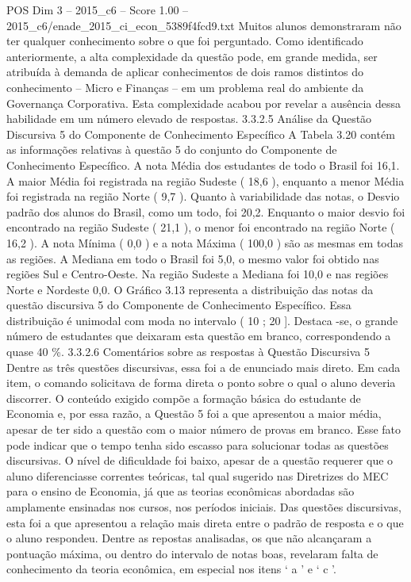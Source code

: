 \begin{textsample}{POS Dim 3 – 2015\_c6 – Score 1.00 – 2015\_c6/enade\_2015\_ci\_econ\_5389f4fcd9.txt}
Muitos alunos demonstraram não ter qualquer conhecimento sobre o que foi perguntado.
Como identificado anteriormente, a alta complexidade da questão pode, em grande medida, ser atribuída à demanda de aplicar conhecimentos de dois ramos distintos do conhecimento – Micro e Finanças – em um problema real do ambiente da Governança Corporativa.
Esta complexidade acabou por revelar a ausência dessa habilidade em um número elevado de respostas. 3.3.2.5 Análise da Questão Discursiva 5 do Componente de Conhecimento Específico A Tabela 3.20 contém as informações relativas à questão 5 do conjunto do Componente de Conhecimento Específico.
A nota Média dos estudantes de todo o Brasil foi 16,1.
A maior Média foi registrada na região Sudeste ( 18,6 ), enquanto a menor Média foi registrada na região Norte ( 9,7 ).
Quanto à variabilidade das notas, o Desvio padrão dos alunos do Brasil, como um todo, foi 20,2.
Enquanto o maior desvio foi encontrado na região Sudeste ( 21,1 ), o menor foi encontrado na região Norte ( 16,2 ).
A nota Mínima ( 0,0 ) e a nota Máxima ( 100,0 ) são as mesmas em todas as regiões.
A Mediana em todo o Brasil foi 5,0, o mesmo valor foi obtido nas regiões Sul e Centro-Oeste.
Na região Sudeste a Mediana foi 10,0 e nas regiões Norte e Nordeste 0,0.
O Gráfico 3.13 representa a distribuição das notas da questão discursiva 5 do Componente de Conhecimento Específico.
Essa distribuição é unimodal com moda no intervalo ( 10 ; 20 ].
Destaca -se, o grande número de estudantes que deixaram esta questão em branco, correspondendo a quase 40 \%. 3.3.2.6 Comentários sobre as respostas à Questão Discursiva 5 Dentre as três questões discursivas, essa foi a de enunciado mais direto.
Em cada item, o comando solicitava de forma direta o ponto sobre o qual o aluno deveria discorrer.
O conteúdo exigido compõe a formação básica do estudante de Economia e, por essa razão, a Questão 5 foi a que apresentou a maior média, apesar de ter sido a questão com o maior número de provas em branco.
Esse fato pode indicar que o tempo tenha sido escasso para solucionar todas as questões discursivas.
O nível de dificuldade foi baixo, apesar de a questão requerer que o aluno diferenciasse correntes teóricas, tal qual sugerido nas Diretrizes do MEC para o ensino de Economia, já que as teorias econômicas abordadas são amplamente ensinadas nos cursos, nos períodos iniciais.
Das questões discursivas, esta foi a que apresentou a relação mais direta entre o padrão de resposta e o que o aluno respondeu.
Dentre as repostas analisadas, os que não alcançaram a pontuação máxima, ou dentro do intervalo de notas boas, revelaram falta de conhecimento da teoria econômica, em especial nos itens ‘ a ’ e ‘ c ’.

\end{textsample}

